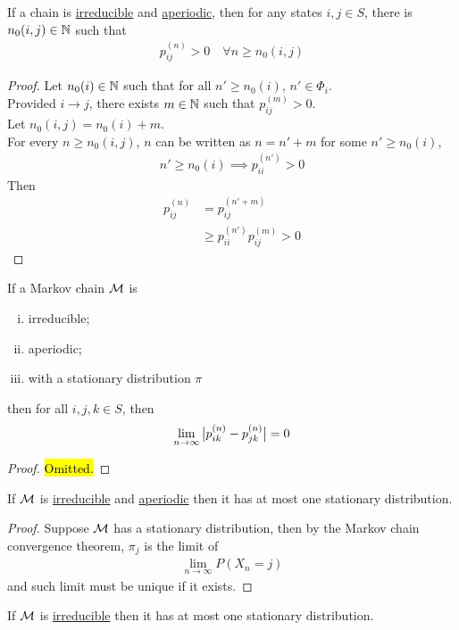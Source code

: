 \documentclass{article}
\newcommand{\upn}[0]{^{(n)}}
\begin{document}
	\begin{corollary}
		If a chain is \ul{irreducible} and \ul{aperiodic}, then for any states $i, j \in S$, there is $n_0(i, j) \in \mathbb{N}$ such that
		\begin{align}
			p_{ij}\upn > 0\quad \forall n \geq n_0(i, j)
		\end{align}
	\end{corollary}

	\begin{proof}
		Let $n_0(i) \in \mathbb{N}$ such that for all $n' \geq n_0(i)$, $n' \in \Phi_i$. \\
		Provided $i \rightarrow j$, there exists $m \in \mathbb{N}$ such that $p_{ij}^{(m)} >0$. \\
		Let $n_0(i, j) = n_0(i) + m$. \\
		For every $n \geq n_0(i, j)$, $n$ can be written as $n = n' + m$ for some $n' \geq n_0(i)$, 
		\begin{align}
			n' \geq n_0(i) \implies p_{ii}^{(n')} > 0
		\end{align}
		Then
		\begin{align}
			p_{ij}\upn &= p_{ij}^{(n' + m)} \\
			&\geq p_{ii}^{(n')} p_{ij}^{(m)} > 0
		\end{align}
	\end{proof}
	
	\begin{lemma}
		If a Markov chain $\mathcal{{M}}$ is
		\begin{enumerate}[(i)]
			\item irreducible;
			\item aperiodic;
			\item with a stationary distribution $\pi$
		\end{enumerate}
		then for all $i, j, k \in S$, then
		\begin{align}
			\lim_{n \to \infty} \abs{
				p_{ik}\upn - p_{jk}\upn
			} = 0
		\end{align}
	\end{lemma}
	
	\begin{proof}
		\hl{Omitted.}
	\end{proof}
	
	\begin{corollary}
		If $\mathcal{{M}}$ is \ul{irreducible} and \ul{aperiodic} then it has at most one stationary distribution.
	\end{corollary}

	\begin{proof}
		Suppose $\mathcal{{M}}$ has a stationary distribution, then by the Markov chain convergence theorem, $\pi_j$ is the limit of 
		\begin{align}
			\lim_{n \to \infty} P(X_n = j)
		\end{align}
		and such limit must be unique if it exists.
	\end{proof}

	\begin{corollary}
		If $\mathcal{{M}}$ is \ul{irreducible} then it has at most one stationary distribution.
	\end{corollary}
\end{document}
